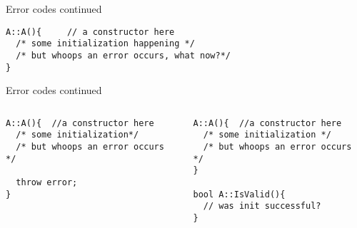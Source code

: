 \documentclass[10pt,a4paper]{beamer}
\begin{document}

\begin{frame}[fragile]{Error codes continued}
	\begin{verbatim}
A::A(){ 	// a constructor here
  /* some initialization happening */
  /* but whoops an error occurs, what now?*/
}
	\end{verbatim}
\end{frame}

\begin{frame}[fragile]{Error codes continued}

	\begin{columns}
		\begin{column}{0.48\linewidth}
			\begin{verbatim}
A::A(){  //a constructor here
  /* some initialization*/
  /* but whoops an error occurs */

  throw error; 
}
			\end{verbatim}
		\end{column}
	\pause
		\begin{column}{0.48\linewidth}
			\begin{verbatim}
A::A(){  //a constructor here
  /* some initialization */
  /* but whoops an error occurs */
}	

bool A::IsValid(){ 
  // was init successful?
} 
	
			\end{verbatim}
		\end{column}
	\end{columns}
\end{frame}
	
\end{document}
